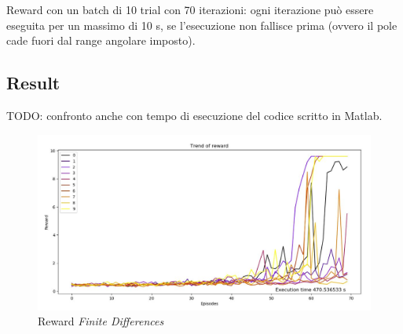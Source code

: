 Reward con un batch di 10 trial con 70 iterazioni: ogni iterazione può essere eseguita per un massimo di 10 s, se l'esecuzione non fallisce prima (ovvero il pole cade fuori dal range angolare imposto).

\subsection{Result}
TODO: confronto anche con tempo di esecuzione del codice scritto in Matlab.
\begin{figure}[!h]
	\centering
	\includegraphics[width=\textwidth]{Immagini/Reward_FD.JPG}
	\caption{Reward \textit{Finite Differences}}
	\label{fig:Reward_FD}
\end{figure}

\newpage